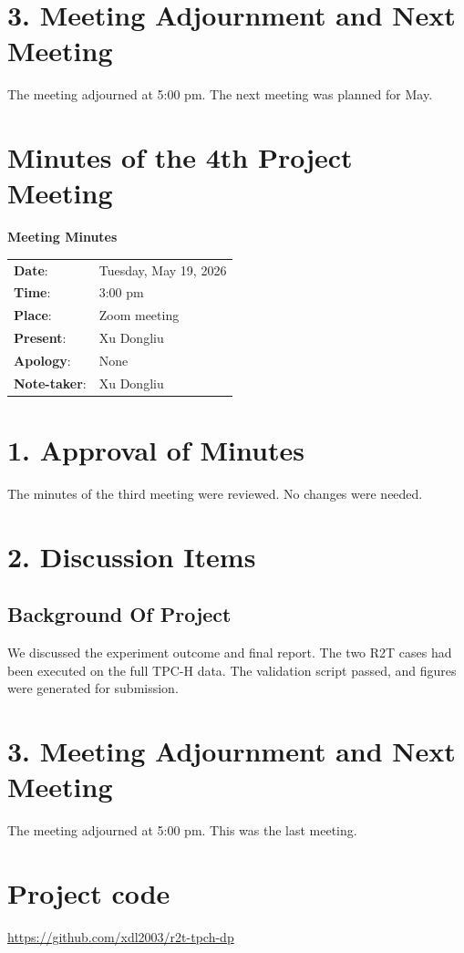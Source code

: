 \documentclass[12pt,a4paper]{report}
\begin{document}
\section*{3. Meeting Adjournment and Next Meeting}
The meeting adjourned at 5:00 pm. The next meeting was planned for May.

\newpage

\section{Minutes of the 4th Project Meeting}
\begin{center}
\textbf{Meeting Minutes}
\end{center}

\begin{tabular}{ll}
\textbf{Date}: & Tuesday, May 19, 2026 \\
\textbf{Time}: & 3:00 pm \\
\textbf{Place}: & Zoom meeting \\
\textbf{Present}: & Xu Dongliu \\
\textbf{Apology}: & None \\
\textbf{Note-taker}: & Xu Dongliu \\
\end{tabular}

\section*{1. Approval of Minutes}
The minutes of the third meeting were reviewed. No changes were needed.

\section*{2. Discussion Items}
\subsection*{Background Of Project}
We discussed the experiment outcome and final report. The two R2T cases
had been executed on the full TPC-H data. The validation script passed,
and figures were generated for submission.

\section*{3. Meeting Adjournment and Next Meeting}
The meeting adjourned at 5:00 pm. This was the last meeting.

\newpage

\section{Project code}
\url{https://github.com/xdl2003/r2t-tpch-dp}
\end{document}
